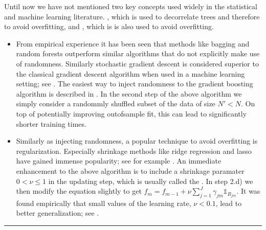 \documentclass[letterpaper,10pt,english]{sphinxmanual}
\begin{document}
Until now we have not mentioned two key concepts used widely in the statistical and machine learning literature. , which is used to decorrelate trees and therefore to avoid overfitting, and , which is is also used to avoid overfitting.
\begin{itemize}
\item {} 
From empirical experience it has been seen that methods like bagging  and random forests  outperform similar algorithms that do not explicitly make use of randomness. Similarly stochastic gradient descent is considered superior to the classical gradient descent algorithm when used in a machine learning setting; see . The easiest way to inject randomness to the gradient boosting algorithm is described in . In the second step of the above algorithm we simply consider a randommly shuffled subset of the data of size \(N' < N\). On top of potentially improving out\sphinxhyphen{}of\sphinxhyphen{}sample fit, this can lead to significantly shorter training times.

\item {} 
Similarly as injecting randomness, a popular technique to avoid overfitting is regularization. Especially shrinkage methods like ridge regression and lasso have gained immense popularity; see for example . An immediate enhancement to the above algorithm is to include a shrinkage paramater \(0 < \nu \leq 1\) in the updating step, which is usually called the . In step 2.d) we then modify the equation slightly to get
\(f_m = f_{m-1} + \nu \sum_{j=1}^J \gamma_{jm} \mathbb{1}_{R_{jm}}\).
It was found empirically that small values of the learning rate, \(\nu < 0.1\), lead to better generalization; see .

\end{itemize}


\bigskip\hrule\bigskip


\end{document}
